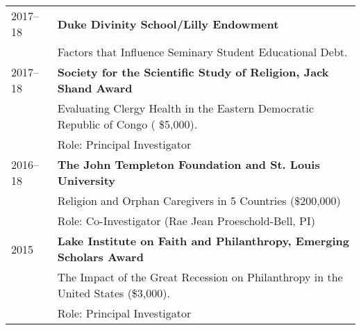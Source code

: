 \begin{longtable}{p{} p{}}
2017--18 & \textbf{Duke Divinity School/Lilly Endowment}\\
& Factors that Influence Seminary Student Educational Debt.\\

2017--18 & \textbf{Society for the Scientific Study of Religion, Jack Shand Award} \\
& Evaluating Clergy Health in the Eastern Democratic Republic of Congo ( \$5,000). \\
& Role: Principal Investigator\\

2016--18 & \textbf{The John Templeton Foundation and St. Louis University}\\
& Religion and Orphan Caregivers in 5 Countries (\$200,000)\\
& Role: Co-Investigator (Rae Jean Proeschold-Bell, PI)\\

2015 & \textbf{Lake Institute on Faith and Philanthropy, Emerging Scholars Award} \\
& The Impact of the Great Recession on Philanthropy in the United States (\$3,000). \\
& Role: Principal Investigator\\
\end{longtable}